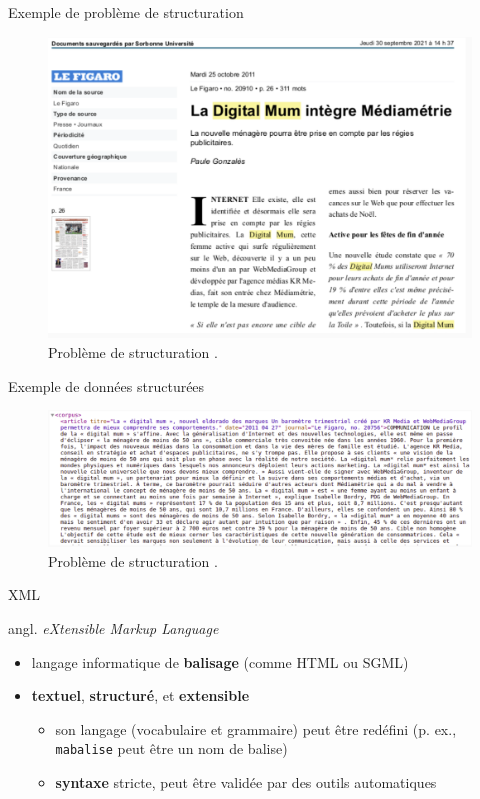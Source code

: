 \documentclass[xetex,xcolor={table,usenames,dvipsnames}]{beamer}
\begin{document}
\begin{frame}{Exemple de problème de structuration}
			\begin{figure}[h] %
		\centering
		\includegraphics[width=.8\linewidth]{img/structuration.png}
		\caption{Problème de structuration \citep{lejeune2023}.}
		\label{fig:ling_out_TAL}
	\end{figure}
\end{frame}

\begin{frame}{Exemple de données structurées}
	\begin{figure}[h] %
		\centering
		\includegraphics[width=1\linewidth]{img/structure.png}
		\caption{Problème de structuration \citep{lejeune2023}.}
		\label{fig:ling_out_TAL}
	\end{figure}
\end{frame}

\begin{frame}{\textsc{XML}}
	
	{\small angl. \textit{eXtensible Markup Language}}
	\begin{itemize}
		\item langage informatique de \textbf{balisage} (comme \textsc{HTML} ou \textsc{SGML})
		\item \textbf{textuel}, \textbf{structuré}, et \textbf{extensible}
		\begin{itemize}
					\item son \og{}langage\fg{} (vocabulaire et grammaire) peut être redéfini (p. ex., \texttt{mabalise} peut être un nom de balise)
			\item \textbf{syntaxe} stricte, peut être validée par des outils automatiques
		\end{itemize} 
	\end{itemize}
\end{frame}
\end{document}
